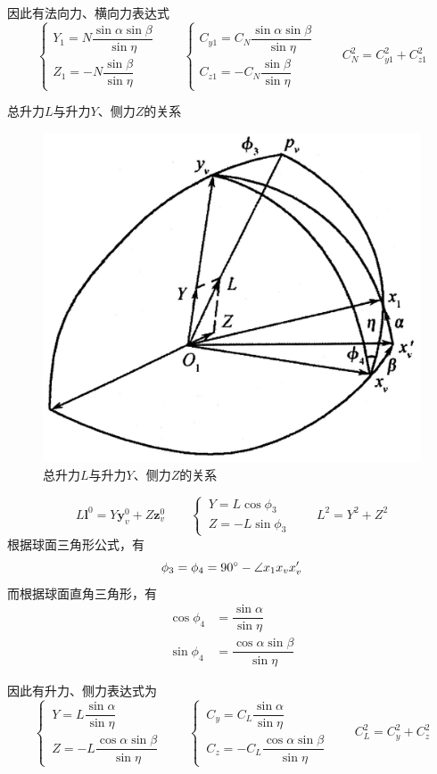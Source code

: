 因此有法向力、横向力表达式
\begin{equation}
	\begin{cases}
		Y_1 = N \dfrac{\sin \alpha \sin \beta }{\sin \eta }\\[0.8em]
		Z_1 = -N \dfrac{\sin \beta}{\sin \eta}
	\end{cases}
	\qquad
	\begin{cases}
		C_{y1} = C_N \dfrac{\sin \alpha \sin \beta}{\sin \eta}\\[0.8em]
		C_{z1} = - C_N \dfrac{\sin \beta}{\sin \eta}
	\end{cases}
	\qquad
	C_N^2 = C_{y1}^2 + C_{z1}^2
\end{equation}
\vspace*{0.5em}

\noa[4] 总升力$L$与升力$Y$、侧力$Z$的关系
\begin{figure}[!htb]
	\centering
	\includegraphics[width=0.4\linewidth]{pic/总升力.jpg}
	\caption{总升力$L$与升力$Y$、侧力$Z$的关系}
\end{figure}
\vspace*{-1em}
\begin{equation}
	L\bm{l}^0 = Y\bm{y}_v^0 + Z\bm{z}_v^0 \qquad 
	\begin{cases}
		\, Y = L \cos \phi_3 \\
		\, Z = - L \sin \phi_3
	\end{cases}
	\qquad 
	L^2 = Y^2 + Z^2
\end{equation}
根据球面三角形公式，有
\begin{equation}
	\phi_3 = \phi_4 = 90{}^{\circ} - \angle x_1x_vx'_v
\end{equation}
而根据球面直角三角形，有
\begin{align}
	\cos \phi_4 &= \dfrac{\sin \alpha}{\sin \eta} \\[0.5em]
	\sin \phi_4 &= \dfrac{\cos \alpha \sin \beta}{\sin \eta}
\end{align}

因此有升力、侧力表达式为
\begin{equation}
	\begin{cases}
		\, Y = L \dfrac{\sin \alpha}{\sin \eta} \\[0.8em]
		\, Z = - L \dfrac{\cos \alpha \sin \beta}{\sin \eta}
	\end{cases}
	\qquad 
	\begin{cases}
		\, C_y = C_L \dfrac{\sin \alpha }{\sin \eta} \\[0.8em]
		\, C_z = - C_L \dfrac{\cos \alpha \sin \beta}{\sin \eta}
	\end{cases}
	\qquad 
	C_L^2 = C_y^2 + C_z^2
\end{equation}
\vspace*{0.5em}

